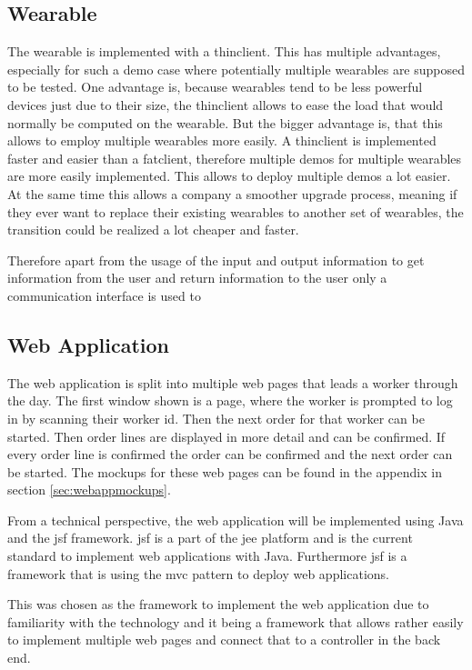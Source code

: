 \subsection{Wearable}
The wearable is implemented with a \gls{thinclient}. This has multiple advantages, especially for such a demo case where potentially multiple wearables are supposed to be tested. One advantage is, because wearables tend to be less powerful devices just due to their size, the \gls{thinclient} allows to ease the load that would normally be computed on the wearable. But the bigger advantage is, that this allows to employ multiple wearables more easily. A \gls{thinclient} is implemented faster and easier than a \gls{fatclient}, therefore multiple demos for multiple wearables are more easily implemented. This allows to deploy multiple demos a lot easier. At the same time this allows a company a smoother upgrade process, meaning if they ever want to replace their existing wearables to another set of wearables, the transition could be realized a lot cheaper and faster.

Therefore apart from the usage of the input and output information to get information from the user and return information to the user only a communication interface is used to 

\subsection{Web Application}
The web application is split into multiple web pages that leads a worker through the day. The first window shown is a page, where the worker is prompted to log in by scanning their worker id. Then the next order for that worker can be started. Then order lines are displayed in more detail and can be confirmed. If every order line is confirmed the order can be confirmed and the next order can be started. The mockups for these web pages can be found in the appendix in section \ref{sec:webappmockups}.

From a technical perspective, the web application will be implemented using Java and the \gls{jsf} framework. \gls{jsf} is a part of the \gls{jee} platform and is the current standard to implement web applications with Java. Furthermore \gls{jsf} is a framework that is using the \gls{mvc} pattern to deploy web applications. 

This was chosen as the framework to implement the web application due to familiarity with the technology and it being a framework that allows rather easily to implement multiple web pages and connect that to a controller in the back end.

